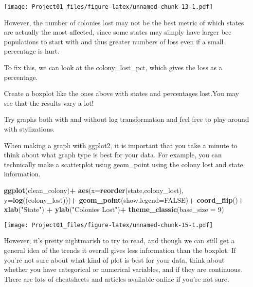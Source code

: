 \documentclass[
]{article}
\newenvironment{Shaded}{\begin{snugshade}}{\end{snugshade}}
\newcommand{\AttributeTok}[1]{\textcolor[rgb]{0.13,0.29,0.53}{#1}}
\newcommand{\ConstantTok}[1]{\textcolor[rgb]{0.56,0.35,0.01}{#1}}
\newcommand{\DecValTok}[1]{\textcolor[rgb]{0.00,0.00,0.81}{#1}}
\newcommand{\FunctionTok}[1]{\textcolor[rgb]{0.13,0.29,0.53}{\textbf{#1}}}
\newcommand{\NormalTok}[1]{#1}
\newcommand{\SpecialCharTok}[1]{\textcolor[rgb]{0.81,0.36,0.00}{\textbf{#1}}}
\newcommand{\StringTok}[1]{\textcolor[rgb]{0.31,0.60,0.02}{#1}}
\begin{document}
\texttt{[image: Project01\_files/figure-latex/unnamed-chunk-13-1.pdf]}

However, the number of colonies lost may not be the best metric of which
states are actually the most affected, since some states may simply have
larger bee populations to start with and thus greater numbers of loss
even if a small percentage is hurt.

To fix this, we can look at the colony\_lost\_pct, which gives the loss
as a percentage.

Create a boxplot like the ones above with states and percentages
lost.You may see that the results vary a lot!

Try graphs both with and without log transformation and feel free to
play around with stylizations.

When making a graph with ggplot2, it is important that you take a minute
to think about what graph type is best for your data. For example, you
can technically make a scatterplot using geom\_point using the colony
lost and state information.

\begin{Shaded}
\begin{Highlighting}[]
\FunctionTok{ggplot}\NormalTok{(clean\_colony)}\SpecialCharTok{+}  
  \FunctionTok{aes}\NormalTok{(}\AttributeTok{x=}\FunctionTok{reorder}\NormalTok{(state,colony\_lost), }\AttributeTok{y=}\FunctionTok{log}\NormalTok{((colony\_lost)))}\SpecialCharTok{+} 
  \FunctionTok{geom\_point}\NormalTok{(}\AttributeTok{show.legend=}\ConstantTok{FALSE}\NormalTok{)}\SpecialCharTok{+} 
  \FunctionTok{coord\_flip}\NormalTok{()}\SpecialCharTok{+} 
  \FunctionTok{xlab}\NormalTok{(}\StringTok{"State"}\NormalTok{) }\SpecialCharTok{+}
  \FunctionTok{ylab}\NormalTok{(}\StringTok{"Colonies Lost"}\NormalTok{)}\SpecialCharTok{+}
  \FunctionTok{theme\_classic}\NormalTok{(}\AttributeTok{base\_size =} \DecValTok{9}\NormalTok{)}
\end{Highlighting}
\end{Shaded}

\texttt{[image: Project01\_files/figure-latex/unnamed-chunk-15-1.pdf]}

However, it's pretty nightmarish to try to read, and though we can still
get a general idea of the trends it overall gives less information than
the boxplot. If you're not sure about what kind of plot is best for your
data, think about whether you have categorical or numerical variables,
and if they are continuous. There are lots of cheatsheets and articles
available online if you're not sure.
\end{document}
